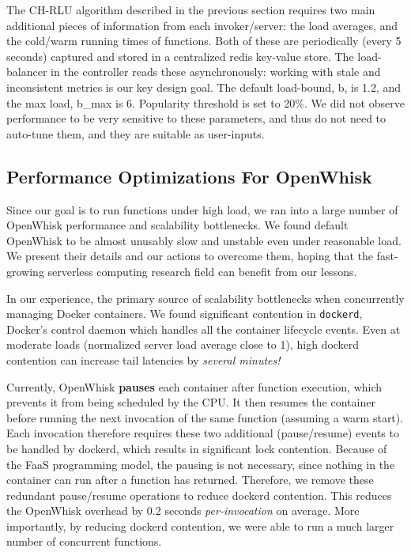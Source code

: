 The CH-RLU algorithm described in the previous section requires two main additional pieces of information from each invoker/server: the load averages, and the cold/warm running times of functions. 
Both of these are periodically (every 5 seconds) captured and stored in a centralized redis key-value store.
The load-balancer in the controller reads these asynchronously: working with stale and inconsistent metrics is our key design goal. 
The default load-bound, b, is 1.2, and the max load, b\_max is 6. Popularity threshold is set to 20\%.
We did not observe performance to be very sensitive to these parameters, and thus do not need to auto-tune them, and they are suitable as user-inputs. 

\subsection{Performance Optimizations For OpenWhisk}

Since our goal is to run functions under high load, we ran into a large number of OpenWhisk performance and scalability bottlenecks.
We found default OpenWhisk to be almost unusably slow and unstable even under reasonable load. 
We present their details and our actions to overcome them, hoping that the fast-growing serverless computing research field can benefit from our lessons. 


In our experience, the primary source of scalability bottlenecks when concurrently managing Docker containers.
We found significant contention in \texttt{dockerd}, Docker's control daemon which handles all the container lifecycle events.
Even at moderate loads (normalized server load average close to 1), high dockerd contention can increase tail latencies by \emph{several minutes!}


Currently, OpenWhisk \textbf{pauses} each container after function execution, which prevents it from being scheduled by the CPU.
It then resumes the container before running the next invocation of the same function (assuming a warm start).
Each invocation therefore requires these two additional (pause/resume) events to be handled by dockerd, which results in significant lock contention.
Because of the FaaS programming model, the pausing is not necessary, since nothing in the container can run after a function has returned.
Therefore, we remove these redundant pause/resume operations to reduce dockerd contention.
This reduces the OpenWhisk overhead by 0.2 seconds \emph{per-invocation} on average.
More importantly, by reducing dockerd contention, we were able to run a much larger number of concurrent functions. 

